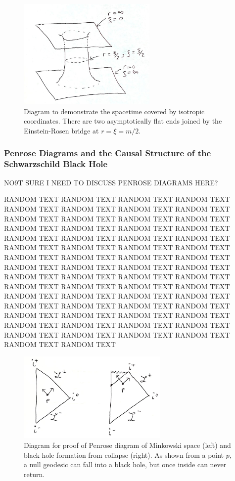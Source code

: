 \begin{figure}[h!]
\centering
    \includegraphics[width=0.6\textwidth]{png/scbh_er_bridge.png}
    \caption{Diagram to demonstrate the spacetime covered by isotropic coordinates. There are two asymptotically flat ends joined by the Einstein-Rosen bridge at $r=\xi=m/2$.}
    \label{intro:fig:scbh_er}
\end{figure}


\subsubsection{Penrose Diagrams and the Causal Structure of the Schwarzschild Black Hole}

NO9T SURE I NEED TO DISCUSS PENROSE DIAGRAMS HERE?


RANDOM TEXT RANDOM TEXT RANDOM TEXT RANDOM TEXT RANDOM TEXT RANDOM TEXT RANDOM TEXT RANDOM TEXT RANDOM TEXT RANDOM TEXT RANDOM TEXT RANDOM TEXT RANDOM TEXT RANDOM TEXT RANDOM TEXT RANDOM TEXT RANDOM TEXT RANDOM TEXT RANDOM TEXT RANDOM TEXT RANDOM TEXT RANDOM TEXT RANDOM TEXT RANDOM TEXT RANDOM TEXT RANDOM TEXT RANDOM TEXT RANDOM TEXT RANDOM TEXT RANDOM TEXT RANDOM TEXT RANDOM TEXT RANDOM TEXT RANDOM TEXT RANDOM TEXT RANDOM TEXT RANDOM TEXT RANDOM TEXT RANDOM TEXT RANDOM TEXT RANDOM TEXT RANDOM TEXT RANDOM TEXT RANDOM TEXT RANDOM TEXT RANDOM TEXT RANDOM TEXT RANDOM TEXT RANDOM TEXT RANDOM TEXT RANDOM TEXT RANDOM TEXT RANDOM TEXT RANDOM TEXT RANDOM TEXT RANDOM TEXT RANDOM TEXT RANDOM TEXT RANDOM TEXT RANDOM TEXT RANDOM TEXT RANDOM TEXT 

\begin{figure}[h!]
\centering
    \includegraphics[width=0.65\textwidth]{png/penrose_mink.png}
    \caption{Diagram for proof of Penrose diagram of Minkowski space (left) and black hole formation from collapse (right). As shown from a point $p$, a null geodesic can fall into a black hole, but once inside can never return. }
    \label{intro:fig:scbh_penrose}
\end{figure}

